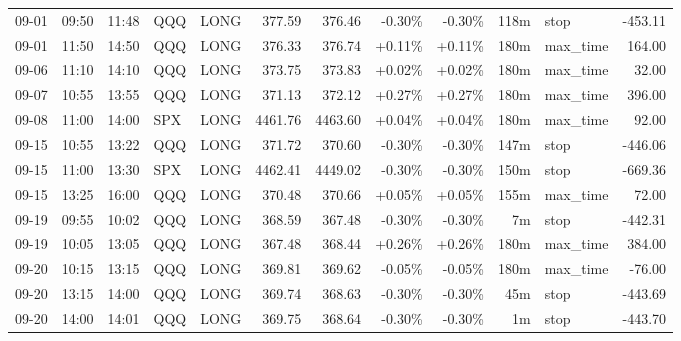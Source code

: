 \documentclass[11pt,a4paper]{article}
\begin{document}
\begin{center}
\begin{longtable}{>{\color{txtmain}}l l l l l r r r r r >{\color{txtmain}}l r}
09-01 & 09:50 & 11:48 & QQQ & LONG & 377.59 & 376.46 & \textcolor{lossred}{-0.30\%} & \textcolor{lossred}{-0.30\%} & 118m & stop & \textcolor{lossred}{-453.11} \\
09-01 & 11:50 & 14:50 & QQQ & LONG & 376.33 & 376.74 & \textcolor{wingreen}{+0.11\%} & \textcolor{wingreen}{+0.11\%} & 180m & max\_time & \textcolor{wingreen}{164.00} \\
09-06 & 11:10 & 14:10 & QQQ & LONG & 373.75 & 373.83 & \textcolor{wingreen}{+0.02\%} & \textcolor{wingreen}{+0.02\%} & 180m & max\_time & \textcolor{wingreen}{32.00} \\
09-07 & 10:55 & 13:55 & QQQ & LONG & 371.13 & 372.12 & \textcolor{wingreen}{+0.27\%} & \textcolor{wingreen}{+0.27\%} & 180m & max\_time & \textcolor{wingreen}{396.00} \\
09-08 & 11:00 & 14:00 & SPX & LONG & 4461.76 & 4463.60 & \textcolor{wingreen}{+0.04\%} & \textcolor{wingreen}{+0.04\%} & 180m & max\_time & \textcolor{wingreen}{92.00} \\
09-15 & 10:55 & 13:22 & QQQ & LONG & 371.72 & 370.60 & \textcolor{lossred}{-0.30\%} & \textcolor{lossred}{-0.30\%} & 147m & stop & \textcolor{lossred}{-446.06} \\
09-15 & 11:00 & 13:30 & SPX & LONG & 4462.41 & 4449.02 & \textcolor{lossred}{-0.30\%} & \textcolor{lossred}{-0.30\%} & 150m & stop & \textcolor{lossred}{-669.36} \\
09-15 & 13:25 & 16:00 & QQQ & LONG & 370.48 & 370.66 & \textcolor{wingreen}{+0.05\%} & \textcolor{wingreen}{+0.05\%} & 155m & max\_time & \textcolor{wingreen}{72.00} \\
09-19 & 09:55 & 10:02 & QQQ & LONG & 368.59 & 367.48 & \textcolor{lossred}{-0.30\%} & \textcolor{lossred}{-0.30\%} & 7m & stop & \textcolor{lossred}{-442.31} \\
09-19 & 10:05 & 13:05 & QQQ & LONG & 367.48 & 368.44 & \textcolor{wingreen}{+0.26\%} & \textcolor{wingreen}{+0.26\%} & 180m & max\_time & \textcolor{wingreen}{384.00} \\
09-20 & 10:15 & 13:15 & QQQ & LONG & 369.81 & 369.62 & \textcolor{lossred}{-0.05\%} & \textcolor{lossred}{-0.05\%} & 180m & max\_time & \textcolor{lossred}{-76.00} \\
09-20 & 13:15 & 14:00 & QQQ & LONG & 369.74 & 368.63 & \textcolor{lossred}{-0.30\%} & \textcolor{lossred}{-0.30\%} & 45m & stop & \textcolor{lossred}{-443.69} \\
09-20 & 14:00 & 14:01 & QQQ & LONG & 369.75 & 368.64 & \textcolor{lossred}{-0.30\%} & \textcolor{lossred}{-0.30\%} & 1m & stop & \textcolor{lossred}{-443.70} \\

\end{longtable}
\end{center}
\end{document}
